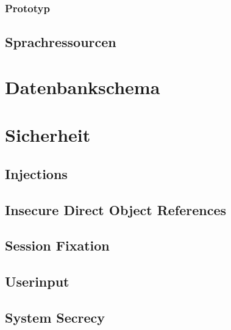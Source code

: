 \documentclass{article}
\begin{document}
\subsubsection{Prototyp}
\subsection{Sprachressourcen}



\section{Datenbankschema}
\subsection{}
\subsection{}
\subsection{}



\section{Sicherheit}

\subsection{Injections}

\subsection{Insecure Direct Object References}

\subsection{Session Fixation}

\subsection{Userinput}

\subsection{System Secrecy}
\end{document}
